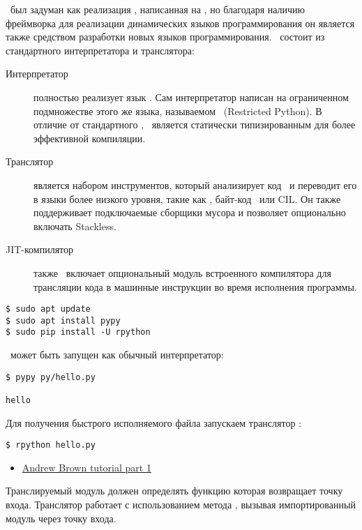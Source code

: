 \label{pypy}\secdown

\noindent
\pp\ был задуман как реализация \py, написанная на \py, но благодаря наличию
фреймворка для реализации динамических языков программирования он является также
средством разработки новых языков программирования.
\pp\ состоит из стандартного интерпретатора и транслятора:
\begin{description}
\item[Интерпретатор] полностью реализует язык \py. Сам интерпретатор написан
на ограниченном подмножестве этого же языка, называемом \rpy\ (Restricted
Python). В отличие от стандартного \py, \rpy\ является статически
типизированным для более эффективной компиляции.
\item[Транслятор] является набором инструментов, который анализирует код \rpy\ и
переводит его в языки более низкого уровня, такие как \emc, байт-код \java\ или
CIL. Он также поддерживает подключаемые сборщики мусора и позволяет опционально
включать Stackless.
\item[JIT-компилятор] также \pp\ включает опциональный модуль встроенного
компилятора для трансляции кода в машинные инструкции во время исполнения
программы.
\end{description}

{}

\begin{verbatim}
$ sudo apt update
$ sudo apt install pypy
$ sudo pip install -U rpython
\end{verbatim}

\pp\ может быть запущен как обычный интерпретатор:

\begin{verbatim}
$ pypy py/hello.py

hello
\end{verbatim}

\clearpage
Для получения быстрого исполняемого файла запускаем транслятор \rpy:
\begin{verbatim}
$ rpython hello.py
\end{verbatim}


\begin{itemize}
  \item 
\href{https://morepypy.blogspot.com/2011/04/tutorial-writing-interpreter-with-pypy.html}{Andrew
Brown tutorial part 1}
\end{itemize}

\clearpage
Транслируемый модуль должен определять функцию  которая возвращает
точку входа. Транслятор работает с использованием метода , вызывая импортированный модуль через точку входа.


\secup
